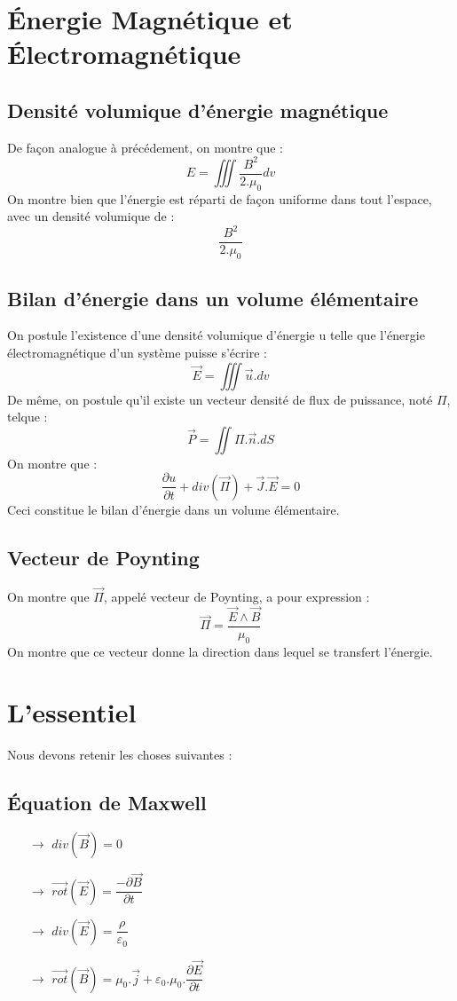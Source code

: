 \section{\'Energie Magnétique et Électromagnétique}
\subsection{Densité volumique d'énergie magnétique}
De façon analogue à précédement, on montre que : 
$$E =\iiint \dfrac{B^2}{2.\mu_0}dv$$
On montre bien que l'énergie est réparti de façon uniforme dans tout l'espace, avec un densité volumique de :
$$\dfrac{B^2}{2.\mu_0}$$
\subsection{Bilan d'énergie dans un volume élémentaire}
On postule l'existence d'une densité volumique d'énergie u telle que l'énergie électromagnétique d'un système puisse s'écrire :
$$\overrightarrow{E} = \iiint \overrightarrow{u}.dv$$
De même, on postule qu'il existe un vecteur densité de flux de puissance, noté $\Pi$, telque : 
$$\overrightarrow{P} = \iint \Pi.\overrightarrow{n}.dS$$
On montre que : 
$$\dfrac{\partial u}{\partial t} + div(\overrightarrow{\Pi}) + \overrightarrow{J}.\overrightarrow{E} = 0$$
Ceci constitue le bilan d'énergie dans un volume élémentaire.
\subsection{Vecteur de Poynting}
On montre que $\overrightarrow{\Pi}$, appelé vecteur de Poynting, a pour expression : 
$$\overrightarrow{\Pi} = \dfrac{\overrightarrow{E}\wedge\overrightarrow{B}}{\mu_0}$$
On montre que ce vecteur donne la direction dans lequel se transfert l'énergie.
\section{L'essentiel}
Nous devons retenir les choses suivantes : 
\subsection{\'Equation de Maxwell}
\begin{itemize}
 \item[$\rightarrow$] $div(\overrightarrow{B}) = 0$
 \item[$\rightarrow$] $\overrightarrow{rot}(\overrightarrow{E}) = \dfrac{-\partial\overrightarrow{B}}{\partial t}$
 \item[$\rightarrow$] $div(\overrightarrow{E}) = \dfrac{\rho}{\varepsilon_0}$
 \item[$\rightarrow$] $\overrightarrow{rot}(\overrightarrow{B}) = \mu_0.\overrightarrow{j}+\varepsilon_0.\mu_0.\dfrac{\partial \overrightarrow{E}}{\partial t}$
\end{itemize}
